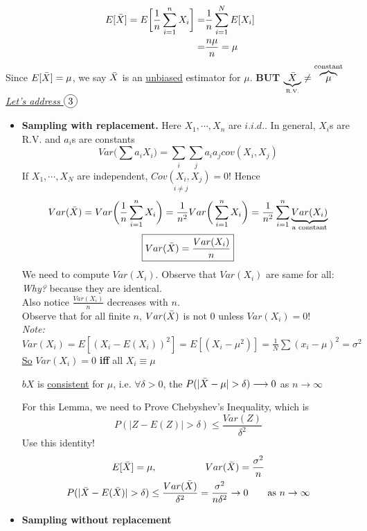 \begin{align*}
	E[\bar{X}] = E\bigg[\frac{1}{n} \sum\limits_{i=1}^n X_i \bigg] = & \frac{1}{n} \sum\limits_{i=1}^N E[X_i]\\
	= & \frac{n\mu}{n} = \mu 
\end{align*}
Since $E[\bar{X}] = \mu$, we say $\bar{X}$ is an \underline{unbiased} estimator for $\mu$. \qquad \textbf{BUT} $\underbrace{\bar{X}}_{\text{\tiny R.V.}} \neq \overbrace{\mu}^{\text{constant}}$\\
\underline{\textit{Let's address $\circled{3}$}}
\begin{itemize}[label={--}]
	\item \textbf{Sampling with replacement.}
	Here $X_1, \cdots, X_n$ are $i.i.d.$. In general, $X_i$s are R.V. and $a_i$s are constants
	\begin{equation*}
		Var\big(\sum a_i X_i\big) = \sum\limits_i \sum\limits_j a_i a_j cov(X_i, X_j) 
	\end{equation*}
	If $X_1, \cdots, X_N$ are independent, $\underset{i \neq j}{Cov(X_i, X_j)} = 0$! Hence
	\begin{gather*}
		Var(\bar{X}) = Var\bigg(\frac{1}{n} \sum\limits_{i=1}^n X_i \bigg) = \frac{1}{n^2} Var\bigg( \sum\limits_{i=1}^n X_i \bigg) = \frac{1}{n^2}  \sum\limits_{i=1}^n \underbrace{Var(X_i)}_{\text{a constant}}\\
		\boxed{Var(\bar{X}) = \frac{Var(X_i)}{n}}
	\end{gather*}
	We need to compute $Var(X_i)$. Observe that $Var(X_i)$ are same for all: \textit{Why?} because they are identical.\\
	Also notice $\frac{Var(X_i)}{n}$ decreases with $n$.\\
	Observe that for all finite $n$, $Var(\bar{X})$ is not 0 unless $Var(X_i) = 0$!\\
	\emph{Note:} $Var(X_i) = E[(X_i - E(X_i))^2] = E[(X_i - \mu^2)] = \frac{1}{N} \sum (x_i - \mu)^2 = \sigma^2$\\
	\underline{So} $Var(X_i) = 0$ \textbf{iff} all $X_i \equiv \mu$
	\begin{lemma}
		$bX$ is \underline{consistent} for $\mu$, i.e. $\forall \delta > 0$, the $P(|\bar{X} - \mu| > \delta) \longrightarrow 0$ as $n\rightarrow \infty$
	\end{lemma}
	For this Lemma, we need to Prove Chebyshev's Inequality, which is
	\begin{equation*}
		P(|Z - E(Z)| > \delta) \leq \frac{Var(Z)}{\delta^2}
	\end{equation*}
	Use this identity!
	\begin{gather*}
		E[\bar{X}] = \mu, \hspace{5em} Var(\bar{X}) = \frac{\sigma^2}{n}\\
		P(|\bar{X} - E(\bar{X})| > \delta) \leq \frac{Var(\bar{X})}{\delta^2} = \frac{\sigma^2}{n\delta^2} \rightarrow 0 \qquad \text{as } n \rightarrow \infty
	\end{gather*}
	\item \textbf{Sampling without replacement}

\end{itemize}